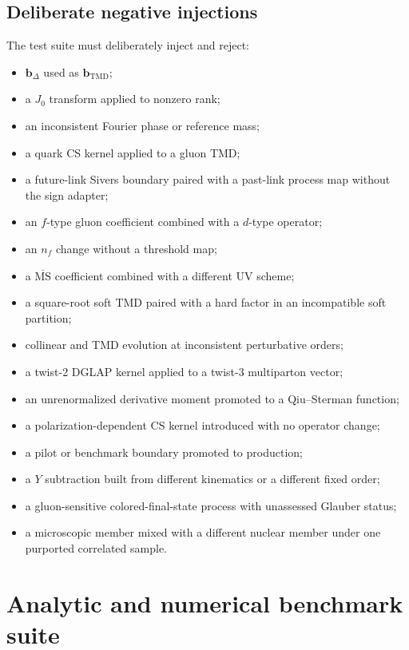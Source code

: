 \documentclass[11pt]{article}
\newcommand{\bD}{\bm{b}_{\Delta}}
\newcommand{\bM}{\bm{b}_{\mathrm{TMD}}}
\newcommand{\MSbar}{\overline{\mathrm{MS}}}
\begin{document}
\subsection{Deliberate negative injections}

The test suite must deliberately inject and reject:
\begin{itemize}
\item \(\bD\) used as \(\bM\);
\item a \(J_0\) transform applied to nonzero rank;
\item an inconsistent Fourier phase or reference mass;
\item a quark CS kernel applied to a gluon TMD;
\item a future-link Sivers boundary paired with a past-link process map without
      the sign adapter;
\item an \(f\)-type gluon coefficient combined with a \(d\)-type operator;
\item an \(n_f\) change without a threshold map;
\item a \(\MSbar\) coefficient combined with a different UV scheme;
\item a square-root soft TMD paired with a hard factor in an incompatible
      soft partition;
\item collinear and TMD evolution at inconsistent perturbative orders;
\item a twist-2 DGLAP kernel applied to a twist-3 multiparton vector;
\item an unrenormalized derivative moment promoted to a Qiu--Sterman function;
\item a polarization-dependent CS kernel introduced with no operator change;
\item a pilot or benchmark boundary promoted to production;
\item a \(Y\) subtraction built from different kinematics or a different
      fixed order;
\item a gluon-sensitive colored-final-state process with unassessed Glauber
      status;
\item a microscopic member mixed with a different nuclear member under one
      purported correlated sample.
\end{itemize}

\section{Analytic and numerical benchmark suite}
\label{sec:benchmarks}
\end{document}
